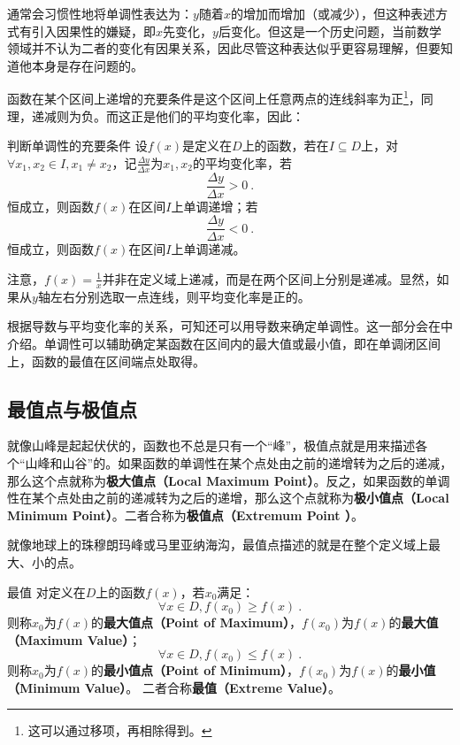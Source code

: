 通常会习惯性地将单调性表达为：$y$随着$x$的增加而增加（或减少），但这种表述方式有引入因果性的嫌疑，即$x$先变化，$y$后变化。但这是一个历史问题，当前数学领域并不认为二者的变化有因果关系，因此尽管这种表达似乎更容易理解，但要知道他本身是存在问题的。

函数在某个区间上递增的充要条件是这个区间上任意两点的连线斜率为正\footnote{这可以通过移项，再相除得到。}，同理，递减则为负。而这正是他们的平均变化率，因此：

\begin{theorem}{判断单调性的充要条件}
设$f(x)$是定义在$D$上的函数，若在$I\subseteq D$上，对$\forall x_1,x_2\in I,x_1\neq x_2$，记$\frac{\Delta y}{\Delta x}$为$x_1,x_2$的平均变化率，若
\begin{equation}
\frac{\Delta y}{\Delta x}>0~.
\end{equation}
恒成立，则函数$f(x)$在区间$I$上单调递增；若
\begin{equation}
\frac{\Delta y}{\Delta x}<0~.
\end{equation}
恒成立，则函数$f(x)$在区间$I$上单调递减。
\end{theorem}

注意，$\displaystyle f(x)=\frac{1}{x}$并非在定义域上递减，而是在两个区间上分别是递减。显然，如果从$y$轴左右分别选取一点连线，则平均变化率是正的。

根据导数与平均变化率的关系，可知还可以用导数来确定单调性。这一部分会在中介绍。单调性可以辅助确定某函数在区间内的最大值或最小值，即在单调闭区间上，函数的最值在区间端点处取得。

\subsection{最值点与极值点}\label{sub_HsFunC_2}

就像山峰是起起伏伏的，函数也不总是只有一个“峰”，极值点就是用来描述各个“山峰和山谷”的。如果函数的单调性在某个点处由之前的递增转为之后的递减，那么这个点就称为\textbf{极大值点（Local Maximum Point）}。反之，如果函数的单调性在某个点处由之前的递减转为之后的递增，那么这个点就称为\textbf{极小值点（Local Minimum Point）}。二者合称为\textbf{极值点（Extremum Point ）}。

就像地球上的珠穆朗玛峰或马里亚纳海沟，最值点描述的就是在整个定义域上最大、小的点。

\begin{definition}{最值}
对定义在$D$上的函数$f(x)$，若$x_0$满足：
\begin{equation}
\forall x\in D,f(x_0)\geq f(x)~.
\end{equation}
则称$x_0$为$f(x)$的\textbf{最大值点（Point of Maximum）}，$f(x_0)$为$f(x)$的\textbf{最大值（Maximum Value）}；
\begin{equation}
\forall x\in D,f(x_0)\leq f(x)~.
\end{equation}
则称$x_0$为$f(x)$的\textbf{最小值点（Point of Minimum）}，$f(x_0)$为$f(x)$的\textbf{最小值（Minimum Value）}。
二者合称\textbf{最值（Extreme Value）}。
\end{definition}

